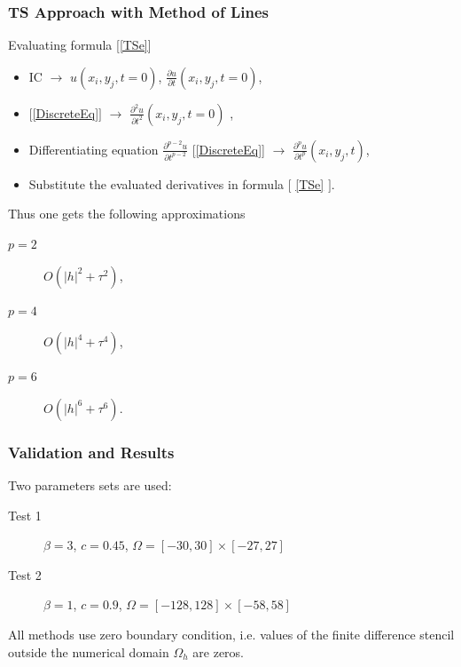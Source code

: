 \documentclass{beamer}
\begin{document}

\begin{frame}
\frametitle{TS Approach with Method of Lines}
Evaluating formula [\ref{TSe}]
\begin{itemize}
 \item IC $\rightarrow$ $u(x_i, y_j, t=0)$, $\frac{ \partial u }{ \partial t }(x_i, y_j, t=0)$,
 \item $[$\ref{DiscreteEq}$]$ $\rightarrow$ $\frac{ \partial^2 u }{ \partial t^2 }(x_i, y_j, t=0)$ ,
 \item Differentiating equation $\frac{ \partial^{p-2} u }{ \partial t^{p-2} }$ [\ref{DiscreteEq}] $\rightarrow$  $\frac{ \partial^p u }{ \partial t^p }(x_i, y_j, t)$,
 \item Substitute the evaluated derivatives in formula $[$ \ref{TSe} $]$.
\end{itemize}


Thus one gets the following approximations
\begin{description}
 \item[$p=2$] $O(|h|^2 + \tau^2)$,
 \item[$p=4$] $O(|h|^4 + \tau^4)$,
 \item[$p=6$] $O(|h|^6 + \tau^6)$.
\end{description}

\end{frame}


\begin{frame}
\frametitle{Validation and Results}
Two parameters sets are used:
\begin{description}
 \item[Test 1] $\beta = 3$, $c = 0.45$, $\Omega = [-30, 30] \times [-27, 27]$
 \item[Test 2] $\beta = 1$, $c = 0.9$, $\Omega = [-128, 128] \times [-58, 58]$
\end{description}

All methods use zero boundary condition, i.e. values of the finite difference stencil outside the numerical domain $\Omega_h$ are zeros.
\end{frame}


\end{document}
